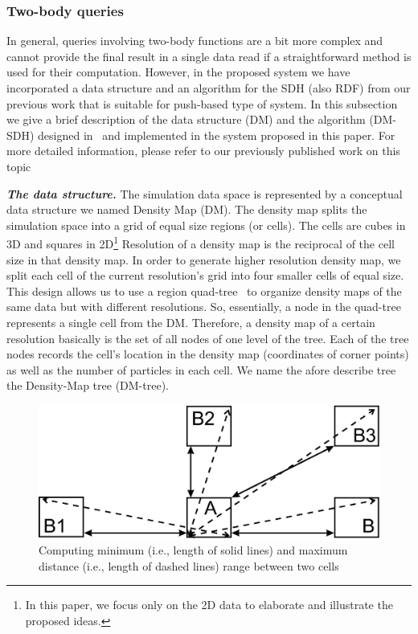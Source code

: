 \documentclass[10pt,journal,final,letterpaper,twocolumn]{IEEEtran}
\begin{document}
\subsubsection{Two-body queries} In general, queries involving two-body functions are a
bit more complex and cannot provide the final result in a single
data read if a straightforward method is used for their computation.
However, in the proposed system we have incorporated a data
structure and an algorithm for the SDH (also RDF) from our previous
work that is suitable for push-based type of system. In this
subsection we give a brief description of the data structure (DM)
and the algorithm (DM-SDH) designed in~\cite{ytu:icde09, EDBT12} and
implemented in the system proposed in this paper. For more detailed
information, please refer to our previously published work on this
topic~\cite{ytu:icde09, EDBT12}

\emph{\textbf{The data structure.}} The simulation data space is
represented by a conceptual data structure we named Density Map
(DM). The density map splits the simulation space into a grid of
equal size regions (or cells). The cells are cubes in 3D and squares
in 2D\footnote{In this paper, we focus only on the 2D data to
elaborate and illustrate the proposed ideas.} Resolution of a
density map is the reciprocal of the cell size in that density map.
In order to generate higher resolution density map, we split each
cell of the current resolution's grid into four smaller cells of
equal size. This design allows us to use a region
quad-tree~\cite{orenstein:ipl82} to organize density maps of the
same data but with different resolutions. So, essentially, a node in
the quad-tree represents a single cell from the DM. Therefore, a
density map of a certain resolution basically is the set of all
nodes of one level of the tree. Each of the tree nodes records the
cell's location in the density map (coordinates of corner points) as
well as the number of particles in each cell. We name the afore
describe tree the Density-Map tree (DM-tree).

\begin{figure}
 \centerline{ \includegraphics[width=0.65\columnwidth]{images/resolve.eps} }
 \caption{Computing minimum (i.e., length of solid lines) and
 maximum distance (i.e., length of dashed lines) range between two
cells}
 \label{fg:resolve}
\end{figure}
\end{document}
